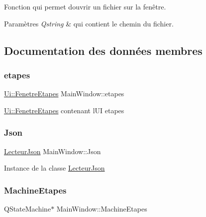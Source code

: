 Fonction qui permet d\textquotesingle{}ouvrir un fichier sur la fenêtre. 


\begin{DoxyParams}{Paramètres}
{\em Qstring} & qui contient le chemin du fichier. \\
\hline
\end{DoxyParams}


\subsection{Documentation des données membres}
\mbox{\label{class_main_window_aee806e7be315f0cc67e8e7cd19f7d651}} 
\subsubsection{\texorpdfstring{etapes}{etapes}}
{\footnotesize\ttfamily \hyperlink{class_ui_1_1_fenetre_etapes}{Ui\+::\+Fenetre\+Etapes} Main\+Window\+::etapes\hspace{0.3cm}{\ttfamily [private]}}

\hyperlink{class_ui_1_1_fenetre_etapes}{Ui\+::\+Fenetre\+Etapes} contenant l\textquotesingle{}UI etapes \mbox{\label{class_main_window_a9db0843494679d79521b63ca3b6f3f7e}} 
\subsubsection{\texorpdfstring{Json}{Json}}
{\footnotesize\ttfamily \hyperlink{class_lecteur_json}{Lecteur\+Json} Main\+Window\+::\+Json\hspace{0.3cm}{\ttfamily [private]}}

Instance de la classe \hyperlink{class_lecteur_json}{Lecteur\+Json} \mbox{\label{class_main_window_ae4e608b1c0ba194f1e1a1e09905182e2}} 
\subsubsection{\texorpdfstring{Machine\+Etapes}{MachineEtapes}}
{\footnotesize\ttfamily Q\+State\+Machine$\ast$ Main\+Window\+::\+Machine\+Etapes\hspace{0.3cm}{\ttfamily [private]}}

